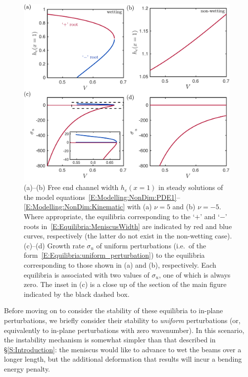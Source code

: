 \documentclass{jfm}
\begin{document}
\begin{figure}
\centering
\includegraphics[width =0.98\textwidth]{figures/Equilibria.pdf}
\caption{(a)--(b) Free end channel width $h_e(x = 1)$ in steady solutions of the model equations~\eqref{E:Modelling:NonDim:PDE1}--\eqref{E:Modelling:NonDim:Kinematic} with (a) $\nu = 5$ and (b) $\nu = -5$. Where appropriate, the equilibria corresponding to the `$+$' and `$-$' roots in~\eqref{E:Equilibria:MeniscusWidth} are indicated by red and blue curves, respectively (the latter do not exist in the non-wetting case). (c)--(d) Growth rate $\sigma_u$ of uniform perturbations (i.e.~of the form~\eqref{E:Equilibria:uniform_perturbation}) to the equilibria corresponding to those shown in (a) and (b), respectively. Each equilibria is associated with two values of $\sigma_u$, one of which is always zero. The inset in (c) is a close up of the section of the main figure indicated by the black dashed box.}\label{fig:Equilibria}
\end{figure}

Before moving on to consider the stability of these equilibria to in-plane perturbations, we briefly consider their stability to \textit{uniform} perturbations (or, equivalently to in-plane perturbations with zero wavenumber). In this scenario, the instability mechanism is somewhat simpler than that described in \S\ref{S:Introduction}: the meniscus would like to advance to wet the beams over a longer length, but the additional deformation that results will incur a bending energy penalty.
\end{document}
